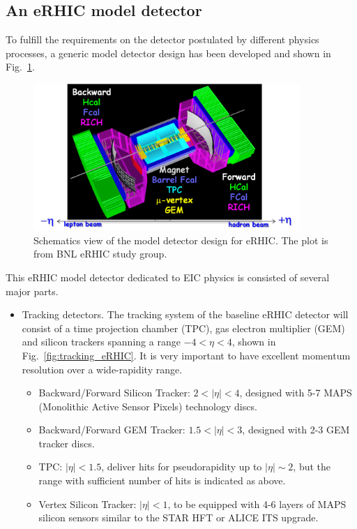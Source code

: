 \subsection{An eRHIC model detector}
To fulfill the requirements on the detector postulated by different physics processes, a generic model detector design has been developed and shown in Fig.~\ref{fig:detector_eRHIC}.
\begin{figure}
\centering
\includegraphics[width=0.9\textwidth]{plots/chpt4/eRHIC_model_detector.png}
\caption[eRHIC detector design]{
Schematics view of the model detector design for eRHIC. The plot is from BNL eRHIC study group.}
\label{fig:detector_eRHIC}
\end{figure}

This eRHIC model detector dedicated to EIC physics is consisted of several major parts.


\begin{itemize}
\item Tracking detectors. The tracking system of the baseline eRHIC detector
will consist of a time projection chamber (TPC), gas electron multiplier (GEM)
and silicon trackers spanning a range $-4<\eta<4$, shown in
Fig.~\ref{fig:tracking_eRHIC}. It is very important to have excellent momentum
resolution over a wide-rapidity range. 
\begin{itemize}
\item Backward/Forward Silicon Tracker: $2<|\eta|<4$, designed with 5-7 MAPS 
(Monolithic Active Sensor Pixels) technology discs.

\item Backward/Forward GEM Tracker: $1.5<|\eta|<3$, designed with 2-3 GEM tracker discs.

\item TPC: $|\eta|<1.5$, deliver hits for pseudorapidity up to $|\eta|\sim2$, but the
range with sufficient number of hits is indicated as above. 

\item Vertex Silicon Tracker: $|\eta|<1$, to be equipped with 4-6 layers of MAPS silicon sensors
similar to the STAR HFT or ALICE ITS upgrade.

\end{itemize}

\end{itemize}



